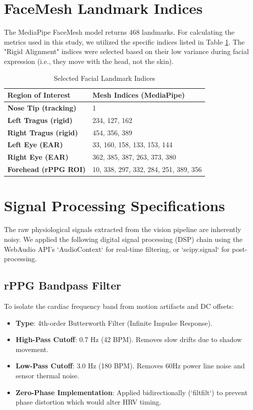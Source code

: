 \documentclass[journal]{IEEEtran}
\begin{document}
\section{FaceMesh Landmark Indices}
The MediaPipe FaceMesh model returns 468 landmarks. For calculating the metrics used in this study, we utilized the specific indices listed in Table \ref{tab:landmarks}.
The "Rigid Alignment" indices were selected based on their low variance during facial expression (i.e., they move with the head, not the skin).

\begin{table}[h]
\caption{Selected Facial Landmark Indices}
\label{tab:landmarks}
\centering
\begin{tabular}{ll}
\bottomrule
\textbf{Region of Interest} & \textbf{Mesh Indices (MediaPipe)} \\ 
\toprule
\textbf{Nose Tip (tracking)} & 1 \\
\textbf{Left Tragus (rigid)} & 234, 127, 162 \\
\textbf{Right Tragus (rigid)} & 454, 356, 389 \\
\textbf{Left Eye (EAR)} & 33, 160, 158, 133, 153, 144 \\
\textbf{Right Eye (EAR)} & 362, 385, 387, 263, 373, 380 \\
\textbf{Forehead (rPPG ROI)} & 10, 338, 297, 332, 284, 251, 389, 356 \\
\bottomrule
\end{tabular}
\end{table}

\section{Signal Processing Specifications}
The raw physiological signals extracted from the vision pipeline are inherently noisy. 
We applied the following digital signal processing (DSP) chain using the WebAudio API's `AudioContext` for real-time filtering, or `scipy.signal` for post-processing.

\subsection{rPPG Bandpass Filter}
To isolate the cardiac frequency band from motion artifacts and DC offsets:
\begin{itemize}
    \item \textbf{Type}: 4th-order Butterworth Filter (Infinite Impulse Response).
    \item \textbf{High-Pass Cutoff}: 0.7 Hz (42 BPM). Removes slow drifts due to shadow movement.
    \item \textbf{Low-Pass Cutoff}: 3.0 Hz (180 BPM). Removes 60Hz power line noise and sensor thermal noise.
    \item \textbf{Zero-Phase Implementation}: Applied bidirectionally (`filtfilt`) to prevent phase distortion which would alter HRV timing.
\end{itemize}
\end{document}
